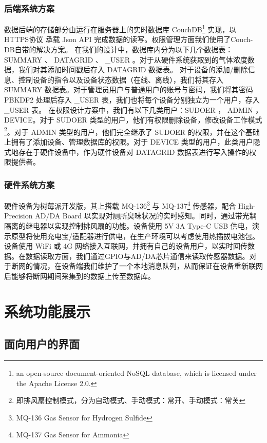 \documentclass[UTF8]{ctexart}
\begin{document}
\subsubsection{后端系统方案}
数据后端的存储部分由运行在服务器上的实时数据库 CouchDB\footnote{an open-source document-oriented NoSQL database, which is licensed under the Apache License 2.0.} 实现，以 HTTPS协议 承载 Json API 完成数据的读写。权限管理方面我们使用了Couch-DB自带的解决方案。
在我们的设计中，数据库内分为以下几个数据表： SUMMARY 、 DATAGRID 、 \_USER 。对于从硬件系统获取到的气体浓度数据，我们对其添加时间戳后存入 DATAGRID 数据表。 对于设备的添加/删除信息、控制设备的指令以及设备状态数据（在线、离线），我们将其存入 SUMMARY 数据表。对于管理员用户与普通用户的账号与密码，我们将其密码 PBKDF2 处理后存入 \_USER 表，我们也将每个设备分别独立为一个用户，存入 \_USER 表。
在权限设计方案中，我们有以下几类用户：SUDOER ， ADMIN ， DEVICE。对于 SUDOER 类型的用户，他们有权限删除设备，修改设备工作模式\footnote{即排风扇控制模式，分为自动模式、手动模式：常开、手动模式：常关}。对于 ADMIN 类型的用户，他们完全继承了 SUDOER 的权限，并在这个基础上拥有了添加设备、管理数据库的权限。对于 DEVICE 类型的用户，此类用户隐式地存在于硬件设备中，作为硬件设备对 DATAGRID 数据表进行写入操作的权限提供者。
\subsubsection{硬件系统方案}
硬件设备为树莓派开发版，其上搭载 MQ-136\footnote{MQ-136 Gas Sensor for Hydrogen Sulfide} 与 MQ-137\footnote{MQ-137 Gas Sensor for Ammonia} 传感器，配合 High-Precision AD/DA Board 以实现对厕所臭味状况的实时感知。同时，通过带光耦隔离的继电器以实现控制排风扇的功能。设备使用 5V 3A Type-C USB 供电，演示原型将使用充电宝/适配器进行供电，在生产环境可以考虑使用热插拔电池包。设备使用 WiFi 或 4G 网络接入互联网，并拥有自己的设备用户，以实时回传数据。在数据读取方面，我们通过GPIO与AD/DA芯片通信来读取传感器数据。对于断网的情况，在设备端我们维护了一个本地消息队列，从而保证在设备重新联网后能够将断网期间采集到的数据上传至数据库。


\section{系统功能展示}

\subsection{面向用户的界面}
\end{document}
